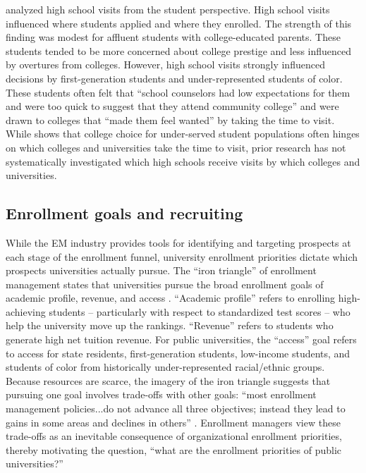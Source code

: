 \documentclass[twoside]{article}
\begin{document}
\cite{RN4324} analyzed high school visits from the student perspective. High school visits influenced where students applied and where they enrolled. The strength of this finding was modest for affluent students with college-educated parents. These students tended to be more concerned about college prestige and less influenced by overtures from colleges. However, high school visits strongly influenced decisions by  first-generation students and under-represented students of color.  These students often felt that ``school counselors had low expectations for them and were too quick to suggest that they attend community college'' and were drawn to colleges that ``made them feel wanted'' by taking the time to visit.  While \cite{RN4324} shows that college choice for under-served student populations often hinges on which colleges and universities take the time to visit, prior research has not systematically investigated which high schools receive visits by which colleges and universities.

\subsection*{Enrollment goals and recruiting}

While the EM industry provides tools for identifying and targeting prospects at each stage of the enrollment funnel, university enrollment priorities dictate which prospects universities actually pursue.  The ``iron triangle'' of enrollment management states that universities pursue the broad enrollment goals of academic profile, revenue, and access \citep{RN2772}. ``Academic profile'' refers to enrolling high-achieving students -- particularly with respect to standardized test scores -- who help the university move up the rankings. ``Revenue'' refers to students who generate high net tuition revenue.  For public universities, the ``access'' goal refers to access for state residents, first-generation students, low-income students, and students of color from historically under-represented racial/ethnic groups. Because resources are scarce, the imagery of the iron triangle suggests that pursuing one goal involves trade-offs with other goals: ``most enrollment management policies...do not advance all three objectives; instead they lead to gains in some areas and declines in others'' \citep[p.~221]{RN2772}. Enrollment managers view these trade-offs as an inevitable consequence of organizational enrollment priorities, thereby motivating the question, ``what are the enrollment priorities of public universities?''
\end{document}
